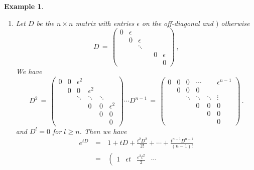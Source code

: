 \documentclass[12pt]{report}
\newtheorem{example}[theorem]{Example}
\newcommand{\nn}{\nonumber}
\begin{document}
\begin{example}
{\begin{enumerate}
\item Let $D$ be the $n \times n$ matrix with entries $\epsilon$ on the off-diagonal and $)$ otherwise 
\begin{equation}\label{ka}
D\,=\, 
\left( \begin{array}{cccccc} 
0  &  \epsilon  &           &          &    &       \\ 
    &  0  &   \epsilon      &          &     &   \\
    &       &\ddots&       &      &   \\
    &      &            &         & 0& \epsilon       \\
    &      &           &           &   &  0      
\end{array} \right) \,, 
\end{equation}
We have 
\begin{equation}
D^2\,=\, 
\left( \begin{array}{cccccc} 
0  &  0  &   \epsilon^2        &          &    &       \\ 
    &  0  &   0      &   \epsilon^2       &     &   \\
    &       &\ddots&  \ddots &  \ddots    &   \\
    &       &           &   0    &  0    & \epsilon^2  \\
    &      &            &         & 0&  0       \\
    &      &           &           &   &  0      
\end{array} \right)   \cdots   D^{n-1}\,=\, 
\left( \begin{array}{cccccc} 
0  &  0  &   0        &     \cdots     &    &  \epsilon^{n-1}     \\ 
    &  0  &   0      &   0       &     &   \\
    &       &\ddots&  \ddots &  \ddots  &\vdots   \\
    &       &           &   0    &  0    & 0  \\
    &      &            &         & 0&    0       \\
    &      &           &           &   &  0      
\end{array}
\right)\,.
\end{equation}
and $D^l=0$ for $l\ge n$.  Then we have 
\begin{eqnarray}
e^{tD} \,&=&\,  1 + tD + \frac{t^2D^2}{2!} 
+ \cdots + \frac{t^{n-1}D^{n-1}}{(n-1)!}  \nn  \\
\,&=&\, 
\left( \begin{array}{cccccc} 
1  &  \epsilon t & \frac{\epsilon^2 t^2}{2}&\cdots &   &  

\end{array}
\end{eqnarray}
\end{enumerate}}
\end{example}
\end{document}
